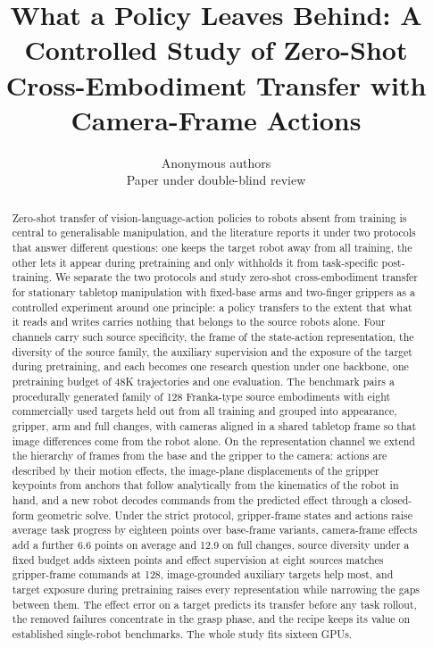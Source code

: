 \documentclass{article} %
\title{What a Policy Leaves Behind: A Controlled Study of Zero-Shot Cross-Embodiment Transfer with Camera-Frame Actions}
\author{Anonymous authors\\
Paper under double-blind review}
\begin{document}
\maketitle

\begin{abstract}
Zero-shot transfer of vision-language-action policies to robots absent from training is central to generalisable manipulation, and the literature reports it under two protocols that answer different questions: one keeps the target robot away from all training, the other lets it appear during pretraining and only withholds it from task-specific post-training. We separate the two protocols and study zero-shot cross-embodiment transfer for stationary tabletop manipulation with fixed-base arms and two-finger grippers as a controlled experiment around one principle: a policy transfers to the extent that what it reads and writes carries nothing that belongs to the source robots alone. Four channels carry such source specificity, the frame of the state-action representation, the diversity of the source family, the auxiliary supervision and the exposure of the target during pretraining, and each becomes one research question under one backbone, one pretraining budget of 48K trajectories and one evaluation. The benchmark pairs a procedurally generated family of 128 Franka-type source embodiments with eight commercially used targets held out from all training and grouped into appearance, gripper, arm and full changes, with cameras aligned in a shared tabletop frame so that image differences come from the robot alone. On the representation channel we extend the hierarchy of frames from the base and the gripper to the camera: actions are described by their motion effects, the image-plane displacements of the gripper keypoints from anchors that follow analytically from the kinematics of the robot in hand, and a new robot decodes commands from the predicted effect through a closed-form geometric solve. Under the strict protocol, gripper-frame states and actions raise average task progress by eighteen points over base-frame variants, camera-frame effects add a further 6.6 points on average and 12.9 on full changes, source diversity under a fixed budget adds sixteen points and effect supervision at eight sources matches gripper-frame commands at 128, image-grounded auxiliary targets help most, and target exposure during pretraining raises every representation while narrowing the gaps between them. The effect error on a target predicts its transfer before any task rollout, the removed failures concentrate in the grasp phase, and the recipe keeps its value on established single-robot benchmarks. The whole study fits sixteen GPUs.
\end{abstract}










\newpage

\end{document}
